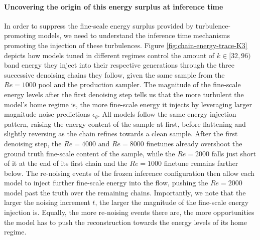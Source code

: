 
\paragraph{Uncovering the origin of this energy surplus at inference time} In order to
suppress the fine-scale energy surplus provided by turbulence-promoting models, we need
to understand the inference time mechanisms promoting the injection of these
turbulences. Figure \ref{fig:chain-energy-trace-K3} depicts how models tuned in
different regimes control the amount of $k\in[32,96)$ band energy they inject into
their respective generations through the three successive denoising chains they follow,
given the same sample from the $Re=1000$ pool and the production sampler. The magnitude
of the fine-scale energy levels after the first denoising step tells us that the more
turbulent the model's home regime is, the more fine-scale energy it injects by
leveraging larger magnitude noise predictions $\epsilon_\theta$. All models follow the
same energy injection pattern, raising the energy content of the sample at first,
before flattening and slightly reversing as the chain refines towards a clean sample.
After the first denoising step, the $Re=4000$ and $Re=8000$ finetunes already overshoot
the ground truth fine-scale content of the sample, while the $Re=2000$ falls just short
of it at the end of its first chain and the $Re=1000$ finetune remains farther
below.\newline
The re-noising events of the frozen inference configuration then allow each model to
inject further fine-scale energy into the flow, pushing the $Re=2000$ model past the
truth over the remaining chains. Importantly, we note that the larger the noising
increment $t$, the larger the magnitude of the fine-scale energy injection is.
Equally, the more re-noising events there are, the more opportunities the model has to
push the reconstruction towards the energy levels of its home regime.\newline

